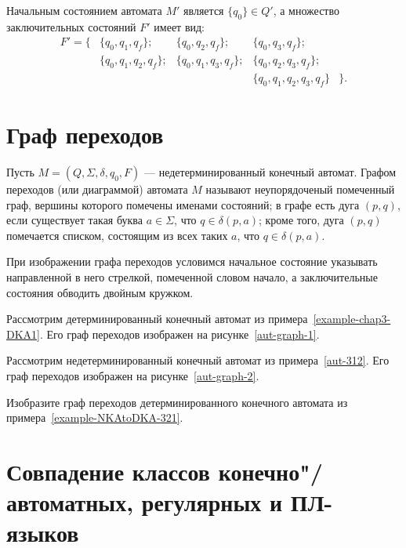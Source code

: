 \begin{myexample}


Начальным состоянием автомата $M'$ является $\{q_0\}\in Q'$, а множество заключительных состояний $F'$ имеет вид:
\[\begin{array}{rllll}
F' = \{
	& \{q_0,q_1,q_f\};     & \{q_0,q_2,q_f\};     & \{q_0,q_3,q_f\};&\\
	& \{q_0,q_1,q_2,q_f\}; & \{q_0,q_1,q_3,q_f\}; & \{q_0,q_2,q_3,q_f\};&\\
	& & & \{q_0,q_1,q_2,q_3,q_f \} & \}.
\end{array}\]
\end{myexample}

\section{Граф переходов}
\label{Chapter3Graph}
Пусть $M=(Q,\Sigma,\delta,q_0,F)$ --- недетерминированный конечный автомат. Графом переходов (или диаграммой) автомата $M$ называют неупорядоченый помеченный граф, вершины которого помечены именами состояний; в графе есть дуга $(p,q)$, если существует такая буква $a\in\Sigma$, что $q\in\delta(p,a)$; кроме того, дуга $(p,q)$ помечается списком, состоящим из всех таких $a$, что $q\in\delta(p,a)$.

При изображении графа переходов условимся начальное состояние указывать направленной в него стрелкой, помеченной словом начало, а заключительные состояния обводить двойным кружком.

\begin{myexample}
Рассмотрим детерминированный конечный автомат из примера~\ref{example-chap3-DKA1}. Его граф переходов изображен на рисунке~\ref{aut-graph-1}.

\end{myexample}

\begin{myexample}
Рассмотрим недетерминированный конечный автомат из примера~\ref{aut-312}. Его граф переходов изображен на рисунке~\ref{aut-graph-2}.

\end{myexample}

\begin{myproblem}
Изобразите граф переходов детерминированного конечного автомата из примера~\ref{example-NKAtoDKA-321}.
\end{myproblem}

\section[Совпадение классов КА-, регулярных и ПЛ-языков]{Совпадение классов конечно"/автоматных, регулярных и ПЛ-языков}
\label{Chapter3MathesFARL}

